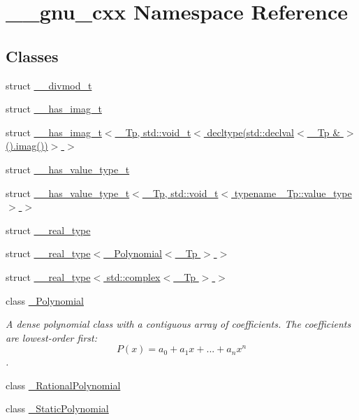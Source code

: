 \hypertarget{namespace____gnu__cxx}{}\section{\+\_\+\+\_\+gnu\+\_\+cxx Namespace Reference}
\label{namespace____gnu__cxx}
\subsection*{Classes}
\begin{DoxyCompactItemize}
\item 
struct \hyperlink{struct____gnu__cxx_1_1____divmod__t}{\+\_\+\+\_\+divmod\+\_\+t}
\item 
struct \hyperlink{struct____gnu__cxx_1_1____has__imag__t}{\+\_\+\+\_\+has\+\_\+imag\+\_\+t}
\item 
struct \hyperlink{struct____gnu__cxx_1_1____has__imag__t_3_01__Tp_00_01std_1_1void__t_3_01decltype_07std_1_1declva705d5f96db36a5134d7de4531d29483c}{\+\_\+\+\_\+has\+\_\+imag\+\_\+t$<$ \+\_\+\+Tp, std\+::void\+\_\+t$<$ decltype(std\+::declval$<$ \+\_\+\+Tp \& $>$().\+imag())$>$ $>$}
\item 
struct \hyperlink{struct____gnu__cxx_1_1____has__value__type__t}{\+\_\+\+\_\+has\+\_\+value\+\_\+type\+\_\+t}
\item 
struct \hyperlink{struct____gnu__cxx_1_1____has__value__type__t_3_01__Tp_00_01std_1_1void__t_3_01typename_01__Tp_1_1value__type_01_4_01_4}{\+\_\+\+\_\+has\+\_\+value\+\_\+type\+\_\+t$<$ \+\_\+\+Tp, std\+::void\+\_\+t$<$ typename \+\_\+\+Tp\+::value\+\_\+type $>$ $>$}
\item 
struct \hyperlink{struct____gnu__cxx_1_1____real__type}{\+\_\+\+\_\+real\+\_\+type}
\item 
struct \hyperlink{struct____gnu__cxx_1_1____real__type_3_01__Polynomial_3_01__Tp_01_4_01_4}{\+\_\+\+\_\+real\+\_\+type$<$ \+\_\+\+Polynomial$<$ \+\_\+\+Tp $>$ $>$}
\item 
struct \hyperlink{struct____gnu__cxx_1_1____real__type_3_01std_1_1complex_3_01__Tp_01_4_01_4}{\+\_\+\+\_\+real\+\_\+type$<$ std\+::complex$<$ \+\_\+\+Tp $>$ $>$}
\item 
class \hyperlink{class____gnu__cxx_1_1__Polynomial}{\+\_\+\+Polynomial}
\begin{DoxyCompactList}\small\item\em A dense polynomial class with a contiguous array of coefficients. The coefficients are lowest-\/order first\+: \[ P(x) = a_0 + a_1 x + ... + a_n x^n \]. \end{DoxyCompactList}\item 
class \hyperlink{class____gnu__cxx_1_1__RationalPolynomial}{\+\_\+\+Rational\+Polynomial}
\item 
class \hyperlink{class____gnu__cxx_1_1__StaticPolynomial}{\+\_\+\+Static\+Polynomial}
\end{DoxyCompactItemize}
